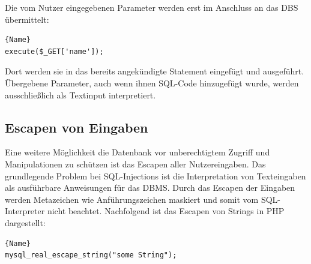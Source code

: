 Die vom Nutzer eingegebenen Parameter werden erst im Anschluss an das DBS übermittelt:
\begin{lstlisting}[caption=Übergabe der Parameter]{Name}
execute($_GET['name']);
\end{lstlisting}
Dort werden sie in das bereits angekündigte Statement eingefügt und ausgeführt. Übergebene Parameter, auch wenn ihnen SQL-Code hinzugefügt wurde, werden ausschließlich als Textinput interpretiert. 
\subsection{Escapen von Eingaben}
Eine weitere Möglichkeit die Datenbank vor unberechtigtem Zugriff und Manipulationen zu schützen ist das Escapen aller Nutzereingaben.
Das grundlegende Problem bei SQL-Injections ist die Interpretation von Texteingaben als ausführbare Anweisungen für das DBMS. Durch das Escapen der Eingaben werden Metazeichen wie Anführungszeichen maskiert und somit vom SQL-Interpreter nicht beachtet. Nachfolgend ist das Escapen von Strings in PHP dargestellt:
\begin{lstlisting}[caption=Escapen von Strings in PHP]{Name}
mysql_real_escape_string("some String");
\end{lstlisting}
